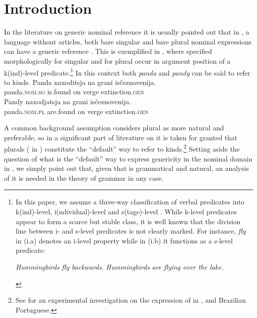 \documentclass[output=paper
,modfonts
,nonflat]{langsci/langscibook}
\begin{document}
	\section{Introduction} \label{sec:borik:1}
	In the literature on generic nominal reference it is usually pointed out that in , a language without articles, both bare singular and bare plural nominal expressions can have a generic reference \citep{Chierchia1998,Doron2003,Dayal2004}. This is exemplified in , where  specified morphologically for singular  and for plural  occur in argument position of a k(ind)-level predicate.\footnote{In this paper, we assume a three-way classification of verbal predicates into k(ind)-level, i(ndividual)-level and s(tage)-level \citep{Carlson1977}. While k-level predicates appear to form a scarce but stable class, it is well known that the division line between i- and s-level predicates is not clearly marked. For instance, \textit{fly} in (i.a) denotes an i-level property while in (i.b) it functions as a s-level predicate: 
		
	\begin{exe}\label{ex:borik:i}
		\begin{xlist}
			\ex\label{ex:borik:ia} \textit{Hummingbirds fly backwards.}
			\ex\label{ex:borik:ib} \textit{Hummingbirds are flying over the lake.}
		\end{xlist}
	\end{exe}}
	\newpage
	In this context both \textit{panda} and \textit{pandy} can be said to refer to kinds. 
	\ea\label{ex:borik:1}
	\ea\label{ex:borik:1a}{
		\gll Panda naxoditsja		na		grani			is\v{c}eznovenija.\\ 
		panda.\textsc{nom.sg} is.found on verge extinction.\textsc{gen}\\
	}
	\ex\label{ex:borik:1b}{
		\gll Pandy		naxodjatsja	na	grani	is\v{c}eznovenija. \\
		panda.\textsc{nom.pl} 	are.found 	on	verge	extinction.\textsc{gen}\\
	}
	\z
	\z
	
	A common background assumption considers plural  as more natural and preferable, so in a significant part of literature on  it is taken for granted that plurals ( in ) constitute the ``default'' way to refer to kinds.\footnote{See \citet{Ionin2011} for an experimental investigation on the expression of  in ,  and Brazilian Portuguese.} Setting aside the question of what is the ``default'' way to express genericity in the nominal domain in , we simply point out that, given that  is grammatical and natural, an analysis of it is needed in the theory of grammar in any case.
	
\end{document}
